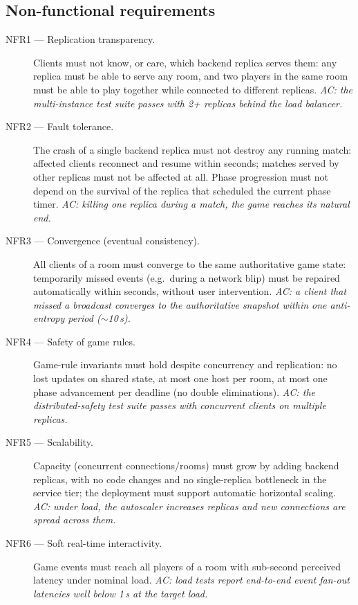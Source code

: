 \documentclass{scrartcl}
\begin{document}
\subsection{Non-functional requirements}

\begin{description}
  \item[NFR1 --- Replication transparency.] Clients must not know, or care,
  which backend replica serves them: any replica must be able to serve any
  room, and two players in the same room must be able to play together
  while connected to different replicas. \emph{AC: the multi-instance test
  suite passes with 2+ replicas behind the load balancer.}

  \item[NFR2 --- Fault tolerance.] The crash of a single backend replica
  must not destroy any running match: affected clients reconnect and
  resume within seconds; matches served by other replicas must not be
  affected at all. Phase progression must not depend on the survival of
  the replica that scheduled the current phase timer. \emph{AC: killing
  one replica during a match, the game reaches its natural end.}

  \item[NFR3 --- Convergence (eventual consistency).] All clients of a room
  must converge to the same authoritative game state: temporarily missed
  events (e.g.\ during a network blip) must be repaired automatically
  within seconds, without user intervention. \emph{AC: a client that missed
  a broadcast converges to the authoritative snapshot within one
  anti-entropy period ($\sim$10\,s).}

  \item[NFR4 --- Safety of game rules.] Game-rule invariants must hold
  despite concurrency and replication: no lost updates on shared state, at
  most one host per room, at most one phase advancement per deadline (no
  double eliminations). \emph{AC: the distributed-safety test suite
  passes with concurrent clients on multiple replicas.}

  \item[NFR5 --- Scalability.] Capacity (concurrent connections/rooms) must
  grow by adding backend replicas, with no code changes and no
  single-replica bottleneck in the service tier; the deployment must
  support automatic horizontal scaling. \emph{AC: under load, the
  autoscaler increases replicas and new connections are spread across
  them.}

  \item[NFR6 --- Soft real-time interactivity.] Game events must reach all
  players of a room with sub-second perceived latency under nominal load.
  \emph{AC: load tests report end-to-end event fan-out latencies well
  below 1\,s at the target load.}


\end{description}
\end{document}
